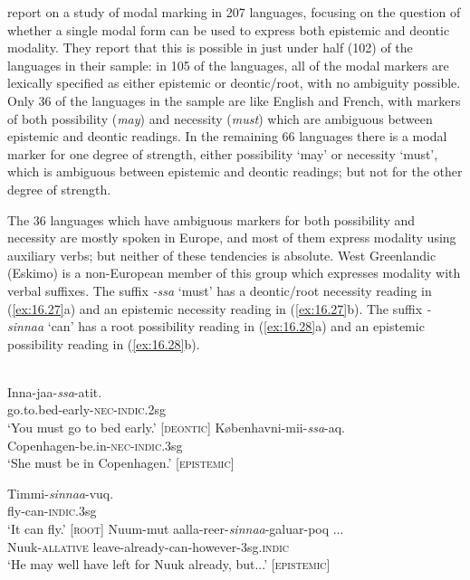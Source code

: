  report on a study of modal marking in 207 languages, focusing on the question of whether a single modal form can be used to express both epistemic and deontic modality. They report that this is possible in just under half (102) of the languages in their sample: in 105 of the languages, all of the modal markers are lexically specified as either epistemic or deontic/root, with no ambiguity possible. Only 36 of the languages in the sample are like English and French, with markers of both possibility (\textit{may}) and necessity (\textit{must}) which are ambiguous between epistemic and deontic readings. In the remaining 66 languages there is a modal marker for one degree of strength, either possibility ‘may’ or necessity ‘must’, which is ambiguous between epistemic and deontic readings; but not for the other degree of strength.


The 36 languages which have ambiguous markers for both possibility and necessity are mostly spoken in Europe, and most of them express modality using auxiliary verbs; but neither of these tendencies is absolute. West Greenlandic (Eskimo) is a non-European member of this group which expresses modality with verbal suffixes. The suffix \textit{-ssa} ‘must’ has a deontic/root necessity reading in (\ref{ex:16.27}a) and an epistemic necessity reading in (\ref{ex:16.27}b). The suffix \textit{-sinnaa} ‘can’ has a root possibility reading in (\ref{ex:16.28}a) and an epistemic possibility reading in (\ref{ex:16.28}b).


\ea \label{ex:16.27}
\\ 
\ea  \gll Inna-jaa-\textit{ssa}-atit.\\
go.to.bed-early-\textsc{nec-indic}.2sg\\
\glt ‘You must go to bed early.’  [\textsc{deontic}]
\ex \gll Københavni-mii-\textit{ssa}-aq.\\
Copenhagen-be.in-\textsc{nec-indic}.3sg\\
\glt ‘She must be in Copenhagen.’  [\textsc{epistemic}]
\z \z

\ea \label{ex:16.28} \gll Timmi-\textit{sinnaa}-vuq.\\
fly-can-\textsc{indic}.3sg\\
\glt ‘It can fly.’  [\textsc{root}]
\ex \gll  Nuum-mut  aalla-reer-\textit{sinnaa}-galuar-poq ...\\
Nuuk-\textsc{allative}  leave-already-can-however-3sg.\textsc{indic}\\
\glt ‘He may well have left for Nuuk already, but...’  [\textsc{epistemic}]
\z


